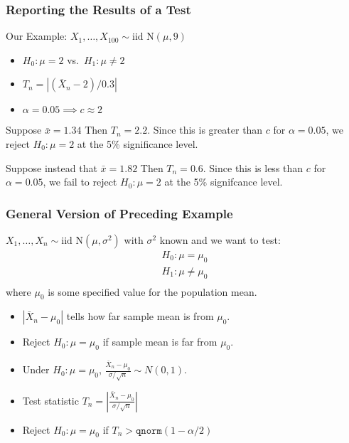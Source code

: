 \begin{frame}
  \frametitle{Reporting the Results of a Test}

  \begin{block}{Our Example: $X_1, \dots, X_{100} \sim \mbox{iid N}(\mu, 9)$}
    
    \begin{itemize}
      \item $H_0\colon \mu = 2$ vs.\ $H_1\colon \mu \neq 2$
      \item $T_n = |(\bar{X}_n - 2)/0.3|$
      \item $\alpha = 0.05 \implies c \approx 2$
    \end{itemize}
  \end{block}

  \pause

  \begin{block}{Suppose $\bar{x}=1.34$}
    Then $T_n = 2.2$. Since this is greater than $c$ for $\alpha = 0.05$, we \alert{reject $H_0\colon \mu=2$ at the 5\% significance level.}
  \end{block}

  \pause

  \begin{block}{Suppose instead that $\bar{x}=1.82$}
   Then $T_n = 0.6$.
   Since this is less than $c$ for $\alpha = 0.05$, we \alert{fail to reject $H_0\colon \mu = 2$ at the 5\% signifcance level.}
  \end{block}


\end{frame}
\begin{frame}
  \frametitle{General Version of Preceding Example}

 $X_1, \dots, X_n \sim \mbox{iid N}(\mu, \sigma^2)$ with $\sigma^2$ known and we want to test:
  \[
    \begin{array}{c}
      H_0\colon \mu = \mu_0\\
      H_1\colon \mu \neq \mu_0\\
    \end{array}
  \]
  where $\mu_0$ is some specified value for the population mean.

  \pause
  
  \begin{itemize}
    \item $|\bar{X}_n - \mu_0|$ tells how far sample mean is from $\mu_0$. \pause
    \item Reject $H_0\colon \mu=\mu_0$ if sample mean is far from $\mu_0$. \pause
    \item Under $H_0\colon \mu = \mu_0$, $\displaystyle\frac{\bar{X}_n - \mu_0}{\sigma/\sqrt{n}} \sim N(0,1)$. \pause
    \item Test statistic $T_n = \displaystyle\left|\frac{\bar{X}_n - \mu_0}{\sigma/\sqrt{n}}\right|$ \pause
    \item Reject $H_0\colon \mu = \mu_0$ if $T_n > \texttt{qnorm}(1 - \alpha/2)$
  \end{itemize}

  
  
\end{frame}
